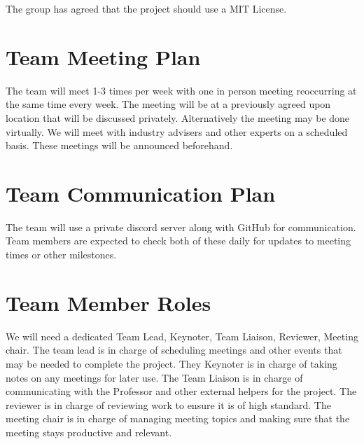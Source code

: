 \documentclass{article}
\begin{document}
The group has agreed that the project should use a MIT License.


\section{Team Meeting Plan}


The team will meet 1-3 times per week with one in person meeting reoccurring at 
the same time every week. The meeting will be at a previously agreed upon 
location that will be discussed privately. Alternatively the meeting may be 
done virtually. We will meet with industry advisers and  other experts on a 
scheduled basis. These meetings will be announced beforehand. 








\section{Team Communication Plan}


The team will use a private discord server along with GitHub for communication. 
Team members are expected to check both of these daily for updates to meeting 
times or other milestones.  

\section{Team Member Roles}

We will need a dedicated Team Lead, Keynoter, Team Liaison, Reviewer, Meeting 
chair.
The team lead is in charge of scheduling meetings and other events that may be 
needed to complete the project. They Keynoter is in charge of taking notes on 
any meetings for later use. The Team Liaison is in charge of communicating with
 the Professor and other external helpers for the project. The reviewer is in
 charge of reviewing work to ensure it is of high standard. The meeting chair 
 is in charge of managing meeting topics and making sure that the meeting stays
 productive and relevant. 
\end{document}
